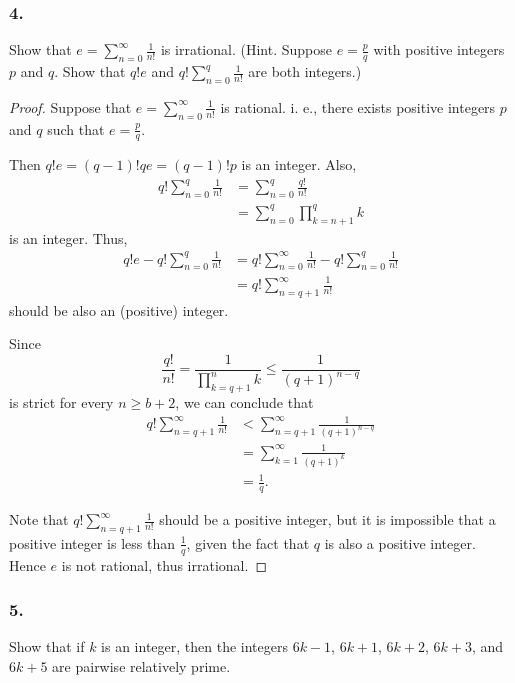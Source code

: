 \subsubsection{4.} Show that $e=\sum_{n=0}^\infty \frac{1}{n!}$ is irrational.
(Hint. Suppose $e=\frac{p}{q}$ with positive integers $p$ and $q$.
Show that $q!e$ and $q!\sum_{n=0}^q \frac{1}{n!}$ are both integers.)

\begin{proof}
    Suppose that $e=\sum_{n=0}^\infty \frac{1}{n!}$ is rational. i. e.,
    there exists positive integers $p$ and $q$ such that $e=\frac{p}{q}$.

    Then $q!e = \left(q-1\right)!qe = \left(q-1\right)!p$ is an integer.
    Also,
    \begin{align*}
        q! \sum_{n=0}^q \frac{1}{n!} &= \sum_{n=0}^q \frac{q!}{n!} \\
        &= \sum_{n=0}^q \prod_{k=n+1}^q k
    \end{align*}
    is an integer. Thus,
    \begin{align*}
        q!e - q!\sum_{n=0}^q \frac{1}{n!}
        &= q!\sum_{n=0}^\infty \frac{1}{n!} - q!\sum_{n=0}^q \frac{1}{n!} \\
        &= q!\sum_{n=q+1}^\infty \frac{1}{n!}
    \end{align*}
    should be also an (positive) integer.

    Since
    \[
        \frac{q!}{n!} = \frac{1}{\prod_{k=q+1}^n k} \leq \frac{1}{\left(q+1\right)^{n-q}}
    \]
    is strict for every $n \geq b+2$, we can conclude that
    \begin{align*}
        q!\sum_{n=q+1}^\infty \frac{1}{n!} &< \sum_{n=q+1}^\infty \frac{1}{\left(q+1\right)^{n-q}} \\
        &= \sum_{k=1}^\infty \frac{1}{\left(q+1\right)^k} \\
        &= \frac{1}{q}.
    \end{align*}

    Note that $q!\sum_{n=q+1}^\infty \frac{1}{n!}$ should be a positive integer,
    but it is impossible that a positive integer is less than $\frac{1}{q}$, given the fact that $q$ is also
    a positive integer. Hence $e$ is not rational, thus irrational.
\end{proof}

\subsubsection{5.} Show that if $k$ is an integer, then the integers
$6k-1$, $6k+1$, $6k+2$, $6k+3$, and $6k+5$ are pairwise relatively prime.

